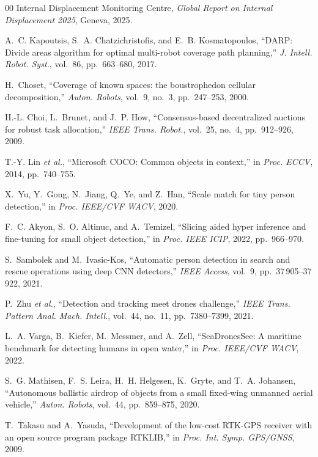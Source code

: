 \documentclass[conference]{IEEEtran}
\begin{document}
\begin{thebibliography}{00}
Internal Displacement Monitoring Centre,
\emph{Global Report on Internal Displacement 2025}, Geneva, 2025.

A.~C. Kapoutsis, S.~A. Chatzichristofis, and E.~B. Kosmatopoulos,
``DARP: Divide areas algorithm for optimal multi-robot coverage path planning,''
\emph{J. Intell. Robot. Syst.}, vol.~86, pp.~663--680, 2017.

H.~Choset,
``Coverage of known spaces: the boustrophedon cellular decomposition,''
\emph{Auton. Robots}, vol.~9, no.~3, pp.~247--253, 2000.

H.-L. Choi, L.~Brunet, and J.~P. How,
``Consensus-based decentralized auctions for robust task allocation,''
\emph{IEEE Trans. Robot.}, vol.~25, no.~4, pp.~912--926, 2009.

T.-Y. Lin \emph{et al.},
``Microsoft COCO: Common objects in context,''
in \emph{Proc. ECCV}, 2014, pp.~740--755.

X.~Yu, Y.~Gong, N.~Jiang, Q.~Ye, and Z.~Han,
``Scale match for tiny person detection,''
in \emph{Proc. IEEE/CVF WACV}, 2020.

F.~C. Akyon, S.~O. Altinuc, and A.~Temizel,
``Slicing aided hyper inference and fine-tuning for small object detection,''
in \emph{Proc. IEEE ICIP}, 2022, pp.~966--970.

S.~Sambolek and M.~Ivasic-Kos,
``Automatic person detection in search and rescue operations using deep CNN
detectors,'' \emph{IEEE Access}, vol.~9, pp.~37\,905--37\,922, 2021.

P.~Zhu \emph{et al.},
``Detection and tracking meet drones challenge,''
\emph{IEEE Trans. Pattern Anal. Mach. Intell.}, vol.~44, no.~11,
pp.~7380--7399, 2021.

L.~A. Varga, B.~Kiefer, M.~Messmer, and A.~Zell,
``SeaDronesSee: A maritime benchmark for detecting humans in open water,''
in \emph{Proc. IEEE/CVF WACV}, 2022.

S.~G. Mathisen, F.~S. Leira, H.~H. Helgesen, K.~Gryte, and T.~A. Johansen,
``Autonomous ballistic airdrop of objects from a small fixed-wing unmanned
aerial vehicle,'' \emph{Auton. Robots}, vol.~44, pp.~859--875, 2020.

T.~Takasu and A.~Yasuda,
``Development of the low-cost RTK-GPS receiver with an open source program
package RTKLIB,'' in \emph{Proc. Int. Symp. GPS/GNSS}, 2009.


\end{thebibliography}
\end{document}
